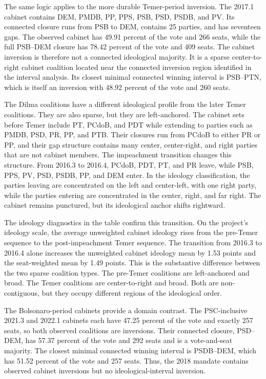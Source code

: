 \documentclass[11pt]{article}
\begin{document}
The same logic applies to the more durable Temer-period inversion. The 2017.1
cabinet contains DEM, PMDB, PP, PPS, PSB, PSD, PSDB, and PV. Its connected
closure runs from PSB to DEM, contains 25 parties, and has seventeen gaps. The
observed cabinet has 49.91 percent of the vote and 266 seats, while the full
PSB--DEM closure has 78.42 percent of the vote and 409 seats. The cabinet
inversion is therefore not a connected ideological majority. It is a sparse
center-to-right cabinet coalition located near the connected inversion region
identified in the interval analysis. Its closest minimal connected winning
interval is PSB--PTN, which is itself an inversion with 48.92 percent of the vote
and 260 seats.

The Dilma coalitions have a different ideological profile from the later
Temer coalitions. They are also sparse, but they are left-anchored. The cabinet
sets before Temer include PT, PCdoB, and PDT while extending to parties such
as PMDB, PSD, PR, PP, and PTB. Their closures run from PCdoB to either PR or
PP, and their gap structure contains many center, center-right, and right parties
that are not cabinet members. The impeachment transition changes this structure.
From 2016.3 to 2016.4, PCdoB, PDT, PT, and PR leave, while PSB, PPS, PV, PSD,
PSDB, PP, and DEM enter. In the ideology classification, the parties leaving are
concentrated on the left and center-left, with one right party, while the parties
entering are concentrated in the center, right, and far right. The cabinet remains
punctured, but its ideological anchor shifts rightward.

The ideology diagnostics in the table confirm this transition. On the project's
ideology scale, the average unweighted cabinet ideology rises from the
pre-Temer sequence to the post-impeachment Temer sequence. The transition from
2016.3 to 2016.4 alone increases the unweighted cabinet ideology mean by 1.53
points and the seat-weighted mean by 1.49 points. This is the substantive
difference between the two sparse coalition types. The pre-Temer coalitions are
left-anchored and broad. The Temer coalitions are center-to-right and broad.
Both are non-contiguous, but they occupy different regions of the ideological
order.

The Bolsonaro-period cabinets provide a domain contrast. The PSC-inclusive
2021.3 and 2022.1 cabinets each have 47.25 percent of the vote and exactly 257
seats, so both observed coalitions are inversions. Their connected closure,
PSD--DEM, has 57.37 percent of the vote and 292 seats and is a vote-and-seat
majority. The closest minimal connected winning interval is PSDB--DEM, which
has 51.52 percent of the vote and 257 seats. Thus, the 2018 mandate contains
observed cabinet inversions but no ideological-interval inversion.
\end{document}
